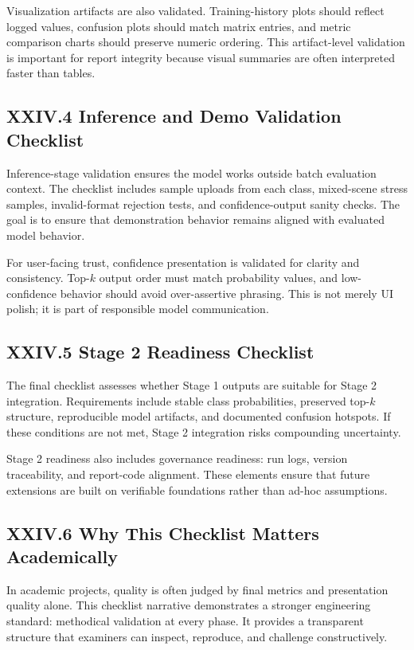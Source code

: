 Visualization artifacts are also validated. Training-history plots should reflect logged values, confusion plots should match matrix entries, and metric comparison charts should preserve numeric ordering. This artifact-level validation is important for report integrity because visual summaries are often interpreted faster than tables.

\subsection*{XXIV.4 Inference and Demo Validation Checklist}
Inference-stage validation ensures the model works outside batch evaluation context. The checklist includes sample uploads from each class, mixed-scene stress samples, invalid-format rejection tests, and confidence-output sanity checks. The goal is to ensure that demonstration behavior remains aligned with evaluated model behavior.

For user-facing trust, confidence presentation is validated for clarity and consistency. Top-$k$ output order must match probability values, and low-confidence behavior should avoid over-assertive phrasing. This is not merely UI polish; it is part of responsible model communication.

\subsection*{XXIV.5 Stage 2 Readiness Checklist}
The final checklist assesses whether Stage 1 outputs are suitable for Stage 2 integration. Requirements include stable class probabilities, preserved top-$k$ structure, reproducible model artifacts, and documented confusion hotspots. If these conditions are not met, Stage 2 integration risks compounding uncertainty.

Stage 2 readiness also includes governance readiness: run logs, version traceability, and report-code alignment. These elements ensure that future extensions are built on verifiable foundations rather than ad-hoc assumptions.

\subsection*{XXIV.6 Why This Checklist Matters Academically}
In academic projects, quality is often judged by final metrics and presentation quality alone. This checklist narrative demonstrates a stronger engineering standard: methodical validation at every phase. It provides a transparent structure that examiners can inspect, reproduce, and challenge constructively.

